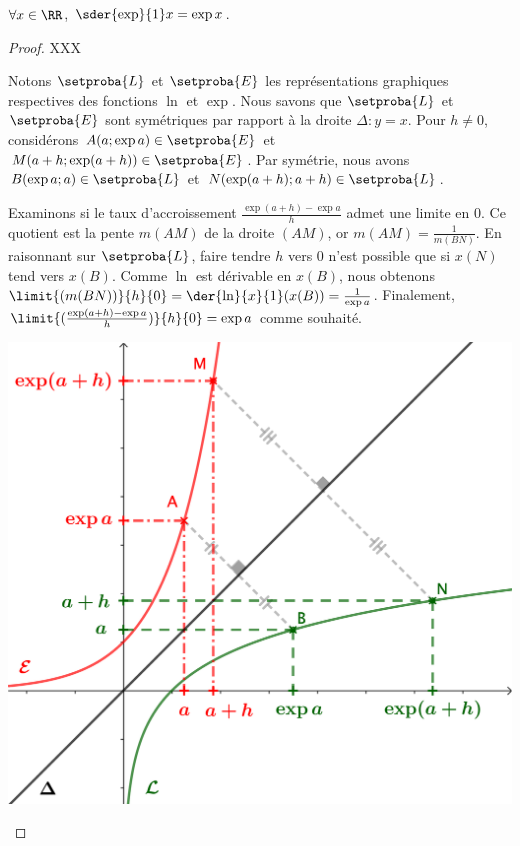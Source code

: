 \begin{fact}
	$\forall x \in \RR$,
	$\sder{\exp}{1} x = \exp x$.
\end{fact}


\begin{proof}
	XXX
	
	Notons $\setproba{L}$ et $\setproba{E}$ les représentations graphiques respectives des fonctions $\ln$ et $\exp$.
	Nous savons que $\setproba{L}$ et $\setproba{E}$ sont symétriques par rapport à la droite $\Delta: y = x$.
	Pour $h \neq 0$, considérons 
	$A(a ; \exp a) \in \setproba{E}$ et $M(a+h ; \exp(a+h)) \in \setproba{E}$.
	Par symétrie, nous avons
	$B(\exp a ; a) \in \setproba{L}$ et $N(\exp(a+h) ; a+h) \in \setproba{L}$.
	
	Examinons si le taux d'accroissement $\frac{\exp(a+h) - \exp a}{h}$ admet une limite en $0$.
	Ce quotient est la pente $m(AM)$ de la droite $(AM)$,
	or $m(AM) = \frac{1}{m(BN)}$.
	En raisonnant sur $\setproba{L}$, faire tendre $h$ vers $0$ n'est possible que si $x(N)$ tend vers $x(B)$.
	Comme $\ln$ est dérivable en $x(B)$, nous obtenons $\limit{(m(BN))}{h}{0} = \der{\ln}{x}{1}(x(B)) = \frac{1}{\exp a}$.
	Finalement,
	$\limit{(\frac{\exp(a+h) - \exp a}{h})}{h}{0} = \exp a$
	comme souhaité.

	\begin{center}
		\includegraphics[scale=.85]{content/exp/eq-diff.png}
	\end{center}
\end{proof}